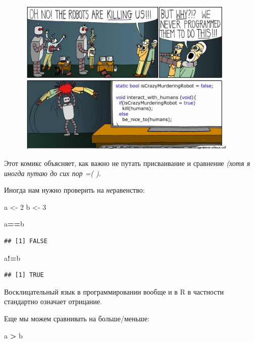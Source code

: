 \documentclass[]{book}
\newenvironment{Shaded}{\begin{snugshade}}{\end{snugshade}}
\newcommand{\DecValTok}[1]{\textcolor[rgb]{0.00,0.00,0.81}{#1}}
\newcommand{\StringTok}[1]{\textcolor[rgb]{0.31,0.60,0.02}{#1}}
\newcommand{\OperatorTok}[1]{\textcolor[rgb]{0.81,0.36,0.00}{\textbf{#1}}}
\newcommand{\NormalTok}[1]{#1}
\begin{document}
\begin{figure}
\centering
\includegraphics[width=4.16667in]{images/WaCM5x3mvQM.jpg}
\caption{}
\end{figure}

Этот комикс объясняет, как важно не путать присваивание и сравнение
\emph{(хотя я иногда путаю до сих пор =( )}.

Иногда нам нужно проверить на \emph{не}равенство:

\begin{Shaded}
\begin{Highlighting}[]
\NormalTok{a <-}\StringTok{ }\DecValTok{2}
\NormalTok{b <-}\StringTok{ }\DecValTok{3}

\NormalTok{a}\OperatorTok{==}\NormalTok{b}
\end{Highlighting}
\end{Shaded}

\begin{verbatim}
## [1] FALSE
\end{verbatim}

\begin{Shaded}
\begin{Highlighting}[]
\NormalTok{a}\OperatorTok{!=}\NormalTok{b}
\end{Highlighting}
\end{Shaded}

\begin{verbatim}
## [1] TRUE
\end{verbatim}

Восклицательный язык в программировании вообще и в R в частности
стандартно означает отрицание.

Еще мы можем сравнивать на больше/меньше:

\begin{Shaded}
\begin{Highlighting}[]
\NormalTok{a }\OperatorTok{>}\StringTok{ }\NormalTok{b}
\end{Highlighting}
\end{Shaded}
\end{document}
